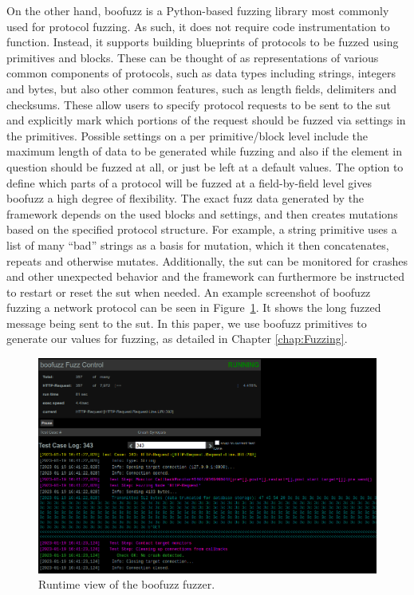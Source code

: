 On the other hand, boofuzz is a Python-based fuzzing library most commonly used for protocol fuzzing. As such, it does not require code instrumentation to function. Instead, it supports building blueprints of protocols to be fuzzed using primitives and blocks. These can be thought of as representations of various common components of protocols, such as data types including strings, integers and bytes, but also other common features, such as length fields, delimiters and checksums. These allow users to specify protocol requests to be sent to the \ac{sut} and explicitly mark which portions of the request should be fuzzed via settings in the primitives. Possible settings on a per primitive/block level include the maximum length of data to be generated while fuzzing and also if the element in question should be fuzzed at all, or just be left at a default values. The option to define which parts of a protocol will be fuzzed at a field-by-field level gives boofuzz a high degree of flexibility. The exact fuzz data generated by the framework depends on the used blocks and settings, and then creates mutations based on the specified protocol structure. For example, a string primitive uses a list of many ``bad'' strings as a basis for mutation, which it then concatenates, repeats and otherwise mutates. Additionally, the \ac{sut} can be monitored for crashes and other unexpected behavior and the framework can furthermore be instructed to restart or reset the \ac{sut} when needed. An example screenshot of boofuzz fuzzing a network protocol can be seen in Figure~\ref{fig:boofuzzcontrolcenter}. It shows the long fuzzed message being sent to the \ac{sut}. In this paper, we use boofuzz primitives to generate our values for fuzzing, as detailed in Chapter \ref{chap:Fuzzing}.

\begin{figure}
	\centering
	\includegraphics[width=0.9\linewidth]{images/boofuzz_control_center}
	\caption{Runtime view of the boofuzz fuzzer.}
	\label{fig:boofuzzcontrolcenter}
\end{figure}

